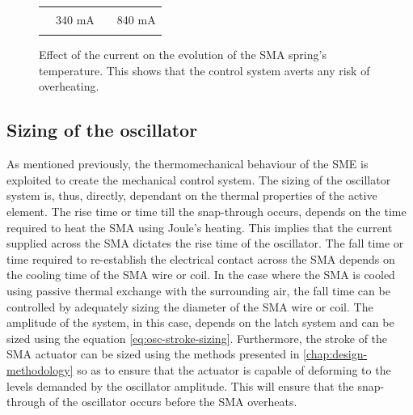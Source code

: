 \begin{figure}[htb!] %
  \centering
      \resizebox{0.75\textwidth}{!}{}
  \begin{tabular}{r@{ }l r@{ }l}
    {\color{myblue} \rule[2pt]{10pt}{0.5mm} } & 340 mA & {\color{myred} \rule[2pt]{10pt}{0.5mm} } & 840 mA
  \end{tabular}
  \caption{Effect of the current on the evolution of the SMA spring's temperature. This shows that the control system averts any risk of overheating.}
  \label{fig:thermal-osc}
\end{figure}

\subsection{Sizing of the oscillator}
As mentioned previously, the thermomechanical behaviour of the SME is exploited to create the mechanical control system. The sizing of the oscillator system is, thus, directly, dependant on the thermal properties of the active element. The rise time or time till the snap-through occurs, depends on the time required to heat the SMA using Joule's heating. This implies that the current supplied across the SMA dictates the rise time of the oscillator. The fall time or time required to re-establish the electrical contact across the SMA depends on the cooling time of the SMA wire or coil. In the case where the SMA is cooled using passive thermal exchange with the surrounding air, the fall time can be controlled by adequately sizing the diameter of the SMA wire or coil. The amplitude of the system, in this case, depends on the latch system and can be sized using the equation \ref{eq:osc-stroke-sizing}. Furthermore, the stroke of the SMA actuator can be sized using the methods presented in \cref{chap:design-methodology} so as to ensure that the actuator is capable of deforming to the levels demanded by the oscillator amplitude. This will ensure that the snap-through of the oscillator occurs before the SMA overheats.

